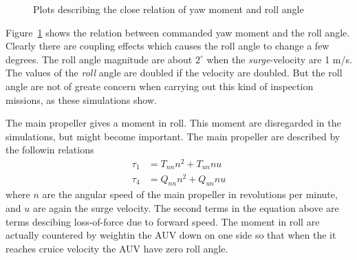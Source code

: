 	\begin{figure}[htbp]
		\centering
		\caption{Plots describing the close relation of yaw moment and roll angle}
		\label{fig:ch4_rollyawmoment}
	\end{figure}
	Figure~\ref{fig:ch4_rollyawmoment} shows the relation between commanded yaw moment and the roll angle.
	Clearly there are coupling effects which causes the roll angle to change a few degrees. The roll angle
	magnitude are about $2^\circ$ when the \textit{surge}-velocity are 1 m/s. The values of the
	\textit{roll} angle are doubled if the velocity are doubled. But the roll angle are not
	of greate concern when carrying out this kind of inspection missions, as these simulations show.

	
	The main propeller gives a moment in roll. This moment are disregarded in the simulations, but might
	become important. The main propeller are described by the followin relations
	\begin{equation}
		\begin{aligned}
			\tau_1 &= T_{nn} n^2 + T_{un} n u \\
			\tau_4 &= Q_{nn} n^2 + Q_{un} n u
		\end{aligned}
	\end{equation}
	where $n$ are the angular speed of the main propeller in revolutions per minute, and $u$ are again the
	surge velocity. The second terms in the equation above are terms descibing loss-of-force due to
	forward speed. The moment in roll are actually countered by weightin the AUV down on one side so that when
	the it reaches cruice velocity the AUV have zero roll angle. \cite{Bjorn_gjelstad_talk}

